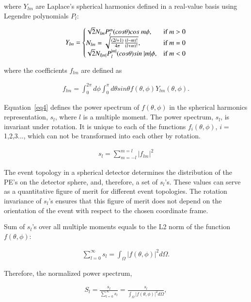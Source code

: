 where $Y_{lm}$ are Laplace's spherical harmonics defined in a real-value basis using Legendre polynomials $P_l$:

\begin{eqnarray}
\label{eq2}
Y_{lm} = \left\{
  \begin{array}{@{}ll@{}}
    \sqrt{2}N_{lm}P_l^m(cos\theta)cos~m\phi, & \text{if}\ m>0 \\
    N_{lm} = \sqrt{\frac{(2l+1)}{4\pi} \frac{(l-m)!}{(l+m)!}}, & \text{if}\ m=0 \\
    \sqrt{2}N_{l|m|}P_l^{|m|}(cos\theta)sin~|m|\phi, & \text{if}\ m<0
  \end{array}\right.
\end{eqnarray}

where the coefficients $f_{lm}$ are defined as
 
\begin{eqnarray}
\label{eq3}
f_{lm} = \int_{0}^{2\pi} d\phi \int_0^{\pi} d\theta sin\theta f(\theta,\phi) Y_{lm}(\theta,\phi).
\end{eqnarray}

Equation~\ref{eq4} defines the power spectrum of $f(\theta,\phi)$ in the spherical harmonics representation, $s_l$, where $l$ is a multiple moment. The power spectrum, $s_l$, is invariant under rotation. It is unique to each of the functions $f_i(\theta,\phi)$, $i=$1,2,3..., which can not be transformed into each other by rotation.

\begin{eqnarray}
\label{eq4}
s_l = \sum_{m=-l}^{m=l} |f_{lm}|^2
\end{eqnarray}

The event topology in a spherical detector determines the distribution of the PE's on the detector sphere, and, therefore, a set of $s_l$'s. These values can serve as a quantitative figure of merit for different event topologies. The rotation invariance of $s_l$'s ensures that this figure of merit does not depend on the orientation of the event with respect to the chosen coordinate frame.

Sum of $s_l$'s over all multiple moments equals to the L2 norm of the function $f(\theta,\phi)$:

\begin{eqnarray}
\label{eq5}
\sum_{l=0}^{\infty} s_l = \int_{\Omega} |f(\theta,\phi)|^2 d\Omega.
\end{eqnarray}

Therefore, the normalized power spectrum,

\begin{eqnarray}
\label{eq6}
S_l = \frac{s_l}{\sum_{l=0}^{\infty} s_l} =  \frac{s_l}{\int_{\Omega} |f(\theta,\phi)|^2 d\Omega},
\end{eqnarray}

